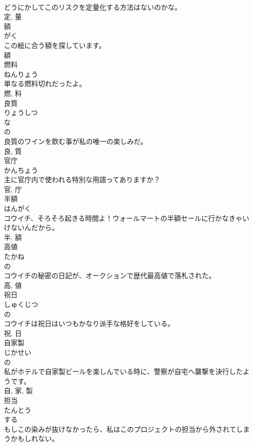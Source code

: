 \documentclass[8pt]{extreport}
\begin{document}
\begin{CJK}{UTF8}{min}
\\	どうにかしてこのリスクを定量化する方法はないのかな。	
\\	定, 量	
\\	額	
\\	がく	
\\	この絵に合う額を探しています。	
\\	額	
\\	燃料	
\\	ねんりょう	
\\	単なる燃料切れだったよ。	
\\	燃, 料	
\\	良質	
\\	りょうしつ	
\\	な 
\\	の 
\\	良質のワインを飲む事が私の唯一の楽しみだ。	
\\	良, 質	
\\	官庁	
\\	かんちょう	
\\	主に官庁内で使われる特別な用語ってありますか？	
\\	官, 庁	
\\	半額	
\\	はんがく	
\\	コウイチ、そろそろ起きる時間よ！ウォールマートの半額セールに行かなきゃいけないんだから。	
\\	半, 額	
\\	高値	
\\	たかね	
\\	の 
\\	コウイチの秘密の日記が、オークションで歴代最高値で落札された。	
\\	高, 値	
\\	祝日	
\\	しゅくじつ	
\\	の 
\\	コウイチは祝日はいつもかなり派手な格好をしている。	
\\	祝, 日	
\\	自家製	
\\	じかせい	
\\	の 
\\	私がホテルで自家製ビールを楽しんでいる時に、警察が自宅へ襲撃を決行したようです。	
\\	自, 家, 製	
\\	担当	
\\	たんとう	
\\	する 
\\	もしこの染みが抜けなかったら、私はこのプロジェクトの担当から外されてしまうかもしれない。	

\end{CJK}
\end{document}
